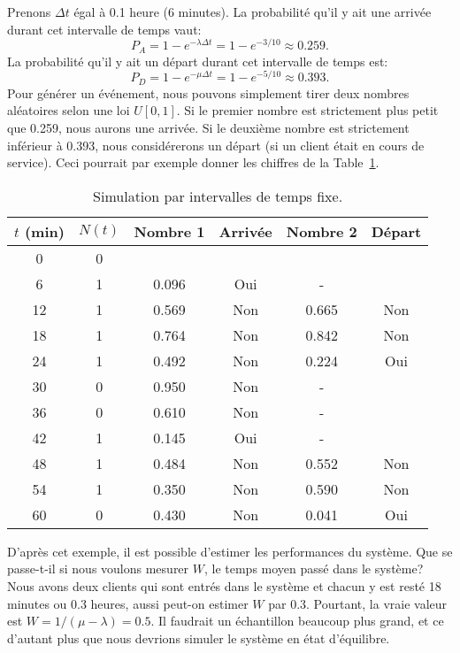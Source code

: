 \begin{example}
Prenons $\Delta t$ égal à 0.1 heure (6 minutes).
La probabilité qu'il y ait une arrivée durant cet intervalle de temps vaut:
\[
P_A = 1 - e^{-\lambda \Delta t} = 1-e^{-3/10} \approx 0.259.
\]
La probabilité qu'il y ait un départ durant cet intervalle de temps est:
\[
P_D = 1 - e^{-\mu \Delta t} = 1-e^{-5/10} \approx 0.393.
\]
Pour générer un événement, nous pouvons simplement tirer deux nombres aléatoires selon une loi $U[0,1]$.
Si le premier nombre est strictement plus petit que 0.259, nous aurons une arrivée.
Si le deuxième nombre est strictement inférieur à 0.393, nous considérerons un départ (si un client était en cours de service).
Ceci pourrait par exemple donner les chiffres de la Table~\ref{tab:simultime}.

\begin{table}[htbp]
\begin{center}
\begin{tabular}{|c|c|c|c|c|c|}
\hline
$t$ (min) & $N(t)$ & Nombre 1 & Arrivée & Nombre 2 & Départ \\
\hline
0 & 0 & & & & \\
\hline
6 & 1 & 0.096 & Oui & - & \\
\hline
12 & 1 & 0.569 & Non & 0.665 & Non \\
\hline
18 & 1 & 0.764 & Non & 0.842 & Non \\
\hline
24 & 1 & 0.492 & Non & 0.224 & Oui \\
\hline
30 & 0 & 0.950 & Non & - & \\
\hline
36 & 0 & 0.610 & Non & - & \\
\hline
42 & 1 & 0.145 & Oui & - & \\
\hline
48 & 1 & 0.484 & Non & 0.552 & Non \\
\hline
54 & 1 & 0.350 & Non & 0.590 & Non \\
\hline
60 & 0 & 0.430 & Non & 0.041 & Oui \\
\hline
\end{tabular}
\caption{Simulation par intervalles de temps fixe.}
\label{tab:simultime}
\end{center}
\end{table}
D'après cet exemple, il est possible d'estimer les performances du système.
Que se passe-t-il si nous voulons mesurer $W$, le temps moyen passé dans le système?
Nous avons deux clients qui sont entrés dans le système et chacun y est resté 18 minutes ou 0.3 heures, aussi peut-on estimer $W$ par 0.3.
Pourtant, la vraie valeur est $W = 1/(\mu-\lambda) = 0.5$.
Il faudrait un \'echantillon beaucoup plus grand, et ce d'autant plus que nous devrions simuler le système en état d'équilibre.


\end{example}
